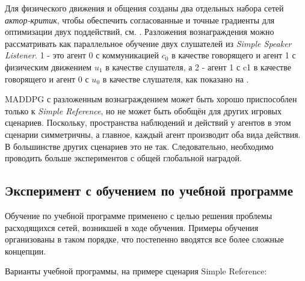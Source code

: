 Для физического движения и общения созданы два отдельных набора сетей \textit{актор-критик}, чтобы обеспечить согласованные и точные градиенты для оптимизации двух поддействий, см. . Разложения вознаграждения можно рассматривать как параллельное обучение двух слушателей из \textit{Simple Speaker Listener}. 1 - это агент 0 с коммуникацией $c_0$ в качестве говорящего и агент 1 с физическим движением $u_1$ в качестве слушателя, а 2 - агент 1 с c1 в качестве говорящего и агент 0 с $u_0$ в качестве слушателя, как показано на .

MADDPG с разложенным вознаграждением может быть хорошо приспособлен только к \textit{Simple Reference}, но не может быть обобщён для других игровых сценариев. Поскольку, пространства наблюдений и действий у агентов в этом сценарии симметричны, а главное, каждый агент производит оба вида действия. В большинстве других сценариев это не так. Следовательно, необходимо проводить больше экспериментов с общей глобальной наградой.

\subsection{Эксперимент с обучением по учебной программе}

Обучение по учебной программе применено с целью решения проблемы расходящихся сетей, возникшей в ходе обучения. Примеры обучения организованы в таком порядке, что постепенно вводятся все более сложные концепции.

Варианты учебной программы, на примере сценария Simple Reference:


